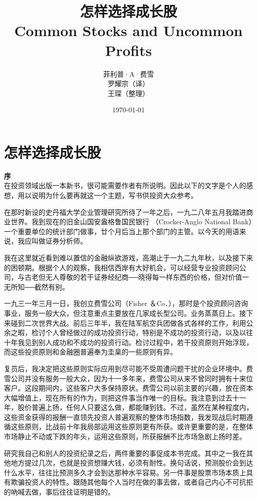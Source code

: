 \documentclass[UTF8,a4paper,zihao=-4,fontset = windows]{ctexart} %
\title{\textbf{怎样选择成长股 \\
                Common Stocks and Uncommon Profits}} %
\author{菲利普·A·费雪  \\   
        罗耀宗（译）    \\
        王琛（整理）}
\date{\today}
\begin{document}
\maketitle
\tableofcontents
\newpage
\part{怎样选择成长股}

\textbf{序}
\\

在投资领域出版一本新书，很可能需要作者有所说明。因此以下的文字是个人的感想，用以说明为什么要再就这一个主题，写书供投资大众参考。

在那时新设的史丹福大学企业管理研究所待了一年之后，一九二八年五月我踏进商业世界。我到现在的旧金山国安盎格鲁国民银行
（Crocker-Anglo National Bank）一个重要单位的统计部门做事，廿个月后当上那个部门的主管。以今天的用语来说，我应叫做证券分析师。

我在这里就近看到难以置信的金融纵欲游戏，高潮止于一九二九年秋，以及接下来的困顿期。根据个人的观察，我相信西岸有大好机会，可以经营专业投资顾问公司，与古老但无人尊敬的若干证券经纪商──晓得每一样东西的价格，但对价值一无所知──截然有别。

一九三一年三月一日，我创立费雪公司（Fisher ＆Co．），那时是个投资顾问咨询事业，服务一般大众，但注意重点主要放在几家成长型公司。业务蒸蒸日上。接下来碰到二次世界大战。前后三年半，我在陆军航空兵团做各式各样的工作，利用公余之暇，检讨个人曾经做过的成功投资行动，特别是不成功的投资行动，以及以往十年我见到别人成功和不成功的投资行动。检讨过程中，若干投资原则开始浮现，而这些投资原则和金融圈普遍奉为圭臬的一些原则有异。

复员后，我决定把这些原则实际应用到尽可能不受周遭问题干扰的企业环境中。费雪公司并没有服务一般大众，因为十一多年来，费雪公司从来不曾同时拥有十来位客户。这段期间内，这些客户大多保持原状。费雪公司以前主要的兴趣，放在资本大幅增值上，现在所有的作为，则把这件事当作唯一的目标。我注意到过去十一年，股价普遍上扬，任何人只要这么做，都能赚到钱。不过，虽然在某种程度内，这些资金获得的报酬一直领先投资人普遍观察的整体市场指数，我发现战后时期遵循这些原则，比战前十年我局部运用这些原则更有所获。或许更重要的是，在整体市场静止不动或下跌的年头，运用这些原则，所获报酬不比市场急剧上扬时差。

研究我自己和别人的投资纪录之后，两件重要的事促成本书完成。其中之一我在其他地方提过几次，也就是投资想赚大钱，必须有耐性。换句话说，预测股价会到达什么水平，往往比预测多久才会到达那种水平容易。另一件事是股票市场本质上具有欺骗投资人的特性。跟随其他每个人当时在做的事去做，或者自己内心不可抗拒的吶喊去做，事后往往证明是错的。
\end{document}
